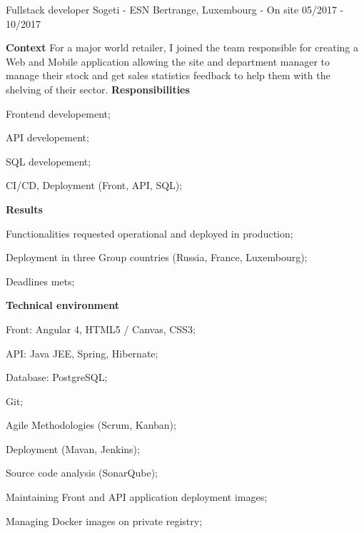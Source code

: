 \begin{cventries}
  \cventry
    {Fullstack developer} %
    {Sogeti - ESN} %
    {Bertrange, Luxembourg - On site} %
    {05/2017 - 10/2017} %
    {
      \textbf{Context}
      \newline
      For a major world retailer, I joined the team responsible for creating a 
      Web and Mobile application allowing the site and department manager to manage 
      their stock and get sales statistics feedback to help them with the shelving 
      of their sector.
      \newline \vspace{2pt}
      \textbf{Responsibilities}
      \newline \vspace{12pt}
      \begin{cvitems}
        \item {Frontend developement;}
        \item {API developement;}
        \item {SQL developement;}
        \item {CI/CD, Deployment (Front, API, SQL);}
      \end{cvitems}
      \textbf{Results}
      \newline \vspace{12pt}
      \begin{cvitems}
        \item {Functionalities requested operational and deployed in production;}
        \item {Deployment in three Group countries (Russia, France, Luxembourg);}
        \item {Deadlines mets;}
      \end{cvitems}
      \textbf{Technical environment}
      \newline \vspace{12pt}
      \begin{cvitems}
        \item {Front: Angular 4, HTML5 / Canvas, CSS3;}
        \item {API: Java JEE, Spring, Hibernate;}
        \item {Database: PostgreSQL;}
        \item {Git;}
        \item {Agile Methodologies (Scrum, Kanban);}
        \item {Deployment (Mavan, Jenkins);}
        \item {Source code analysis (SonarQube);}
        \item {Maintaining Front and API application deployment images;}
        \item {Managing Docker images on private registry;}
      \end{cvitems}
    }


\end{cventries}
